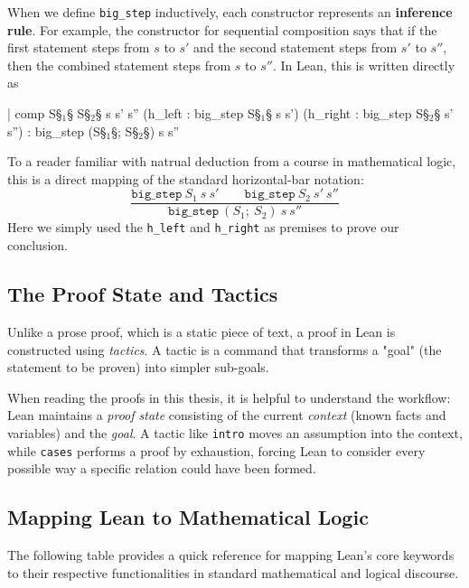 When we define \texttt{big\_step} inductively, each constructor represents an
\textbf{inference rule}. For example, the constructor for sequential composition says that if
the first statement steps from $s$ to $s'$ and the second statement steps from $s'$ to $s''$,
then the combined statement steps from $s$ to $s''$. In Lean, this is written directly as

\begin{Lean_Code}
    | comp {S§\(_1\)§ S§\(_2\)§ s s' s''}
        (h_left  : big_step S§\(_1\)§ s s')
        (h_right : big_step S§\(_2\)§ s' s'') :
            big_step (S§\(_1\)§; S§\(_2\)§) s s''
\end{Lean_Code}

To a reader familiar with natrual deduction from a course
in mathematical logic, this is a direct mapping of the standard horizontal-bar notation:
\[
\frac{\mathtt{big\_step} \ S_1 \ s \ s' \qquad \mathtt{big\_step} \ S_2 \ s' \ s''}{\mathtt{big\_step} \ (S_1;\ S_2) \ s \ s''}
\]
Here we simply used the \texttt{h\_left} and \texttt{h\_right} as premises to prove our conclusion.

\subsection{The Proof State and Tactics}
Unlike a prose proof, which is a static piece of text,
a proof in Lean is constructed using \emph{tactics}.
A tactic is a command that transforms a "goal" (the statement to be proven) into simpler sub-goals.

When reading the proofs in this thesis,
it is helpful to understand the workflow:
Lean maintains a \textit{proof state} consisting of the current \emph{context}
(known facts and variables) and the \emph{goal}.
A tactic like \texttt{intro} moves an assumption into the context,
while \texttt{cases} performs a proof by exhaustion,
forcing Lean to consider every possible way a specific relation could have been formed.

\subsection{Mapping Lean to Mathematical Logic}
The following table provides a quick reference for mapping Lean's core keywords
to their respective functionalities in standard mathematical and logical discourse.


